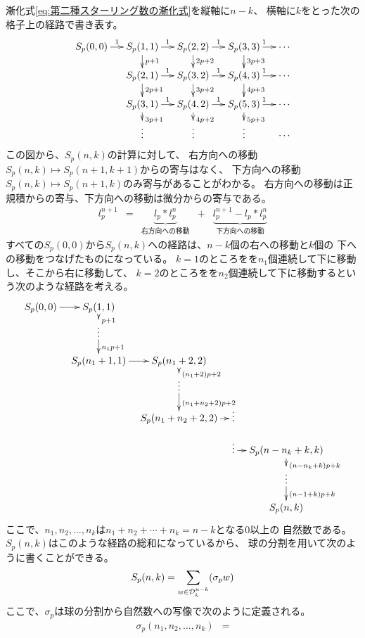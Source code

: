 	漸化式\eqref{eq:第二種スターリング数の漸化式}を縦軸に$n-k$、
	横軸に$k$をとった次の格子上の経路で書き表す。
	\begin{equation*}\xymatrix@R=3ex@C=3ex{
		S_p(0,0)\ar[r]^{1} & S_p(1,1)\ar[r]^{1}\ar[d]^{p+1}
			& S_p(2,2)\ar[r]^{1}\ar[d]^{2p+2} 
			& S_p(3,3)\ar[r]^{1}\ar[d]^{3p+3} & \cdots \\
		& S_p(2,1)\ar[r]^{1}\ar[d]^{2p+1} 
			& S_p(3,2)\ar[r]^{1}\ar[d]^{3p+2} 
			& S_p(4,3)\ar[r]^{1}\ar[d]^{4p+3} & \cdots \\
		& S_p(3,1)\ar[r]^{1}\ar[d]^{3p+1} 
			& S_p(4,2)\ar[r]^{1}\ar[d]^{4p+2} 
			& S_p(5,3)\ar[r]^{1}\ar[d]^{5p+3} & \cdots \\
		& \vdots & \vdots & \vdots & \cdots \\
	}\end{equation*}
	この図から、$S_p(n,k)$の計算に対して、
	右方向への移動$S_p(n,k)\mapsto S_p(n+1,k+1)$からの寄与はなく、
	下方向への移動$S_p(n,k)\mapsto S_p(n+1,k)$のみ寄与があることがわかる。
	右方向への移動は正規積からの寄与、下方向への移動は微分からの寄与である。
	\begin{equation*}\begin{array}{ccccc} %
		l_p^{n+1} &=& \underbrace{l_p*l_p^n}_{右方向への移動}
			&+& \underbrace{l_p^{n+1} - l_p*l_p^n}_{下方向への移動} 
	\end{array}\end{equation*} %
	すべての$S_p(0,0)$から$S_p(n,k)$への経路は、$n-k$個の右への移動と$k$個の
	下への移動をつなげたものになっている。
	$k=1$のところをを$n_1$個連続して下に移動し、そこから右に移動して、
	$k=2$のところをを$n_2$個連続して下に移動するという次のような経路を考える。
	\begin{equation*}\xymatrix@R=2ex@C=2ex{
		S_p(0,0)\ar[r] & S_p(1,1)\ar[d]^{p+1} \\
		& \vdots\ar[d]^{n_1p+1} \\
		& S_p(n_1+1,1)\ar[r] & S_p(n_1+2,2)\ar[d]^{(n_1+2)p+2} \\
		& & \vdots\ar[d]^{(n_1+n_2+2)p+2} \\
		& & S_p(n_1+n_2+2,2)\ar[r] & \vdots \\
		& & & \vdots\ar[r] & S_p(n-n_k+k,k)
			\ar[d]^{(n-n_k+k)p+k} \\
		& & & & \vdots\ar[d]^{(n-1+k)p+k} \\
		& & & & S_p(n,k) \\
	}\end{equation*}
	ここで、$n_1,n_2,\dots,n_k$は$n_1+n_2+\cdots+n_k=n-k$となる$0$以上の
	自然数である。$S_p(n,k)$はこのような経路の総和になっているから、
	球の分割を用いて次のように書くことができる。
	\begin{equation*}\begin{split} %
		S_p(n,k) = \sum_{w\in\hakodama_k^{n-k}}(\sigma_pw)
	\end{split}\end{equation*} %
	ここで、$\sigma_p$は球の分割から自然数への写像で次のように定義される。
	\begin{equation*}\begin{split} %
		\sigma_p(n_1,n_2,\dots,n_k)
		&= 
	\end{split}\end{equation*} %

